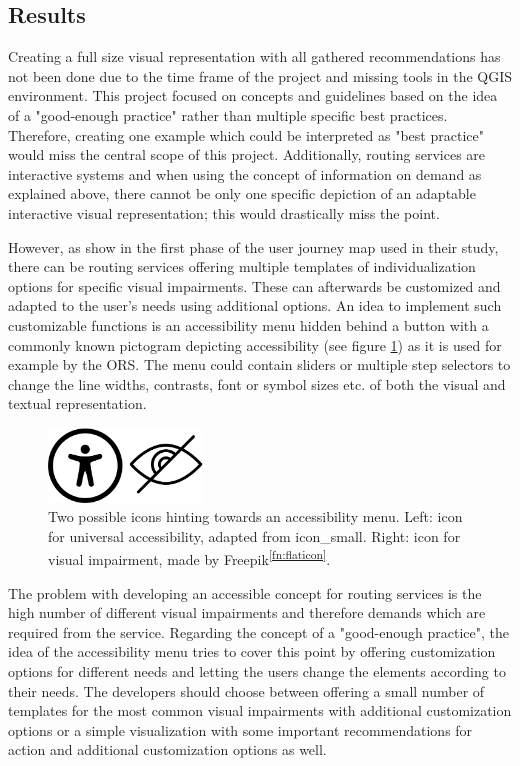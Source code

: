 \documentclass[agile, final]{copernicus-agile}
\begin{document}
\subsection{Results}

Creating a full size visual representation with all gathered recommendations has not been done due to the time frame of the project and missing tools in the QGIS environment. This project focused on concepts and guidelines based on the idea of a "good-enough practice" rather than multiple specific best practices. Therefore, creating one example which could be interpreted as "best practice" would miss the central scope of this project. Additionally, routing services are interactive systems and when using the concept of information on demand as explained above, there cannot be only one specific depiction of an adaptable interactive visual representation; this would drastically miss the point.

However, as \citet{LoitschMuller2023} show in the first phase of the user journey map used in their study, there can be routing services offering multiple templates of individualization options for specific visual impairments. These can afterwards be customized and adapted to the user's needs using additional options. An idea to implement such customizable functions is an accessibility menu hidden behind a button with a commonly known pictogram depicting accessibility (see figure \ref{fig:accessicons}) as it is used for example by the ORS. The menu could contain sliders or multiple step selectors to change the line widths, contrasts, font or symbol sizes etc. of both the visual and textual representation.

\begin{figure}[ht]
  \includegraphics[width=4.1cm]{figures/accessibility_icons.png}
\caption{Two possible icons hinting towards an accessibility menu. Left: icon for universal accessibility, adapted from icon\_small\footnotemark. Right: icon for visual impairment, made by Freepik\textsuperscript{\ref{fn:flaticon}}.}
\label{fig:accessicons}
\end{figure}


The problem with developing an accessible concept for routing services is the high number of different visual impairments and therefore demands which are required from the service. Regarding the concept of a "good-enough practice", the idea of the accessibility menu tries to cover this point by offering customization options for different needs and letting the users change the elements according to their needs. The developers should choose between offering a small number of templates for the most common visual impairments with additional customization options or a simple visualization with some important recommendations for action and additional customization options as well.
\end{document}
